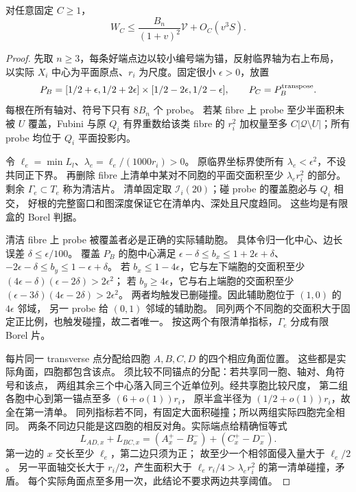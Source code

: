 \begin{lemma}[自适应软权容量]\label{eighth:soft-capacity}
对任意固定 \(C\ge1\)，
\begin{equation}\label{eighth:soft-weight}
 W_C\le\frac{B_n}{(1+v)^2}\mathcal V+O_C(v^3S).
\end{equation}
\end{lemma}
\begin{proof}
先取 \(n\ge3\)，每条好端点边以较小编号端为锚，反射临界轴为右上布局，
以实际 \(X_i\) 中心为平面原点、\(r_i\) 为尺度。固定很小
\(\epsilon>0\)，放置
\[
 P_B=[1/2+\epsilon,1/2+2\epsilon]\times[1/2-2\epsilon,1/2-\epsilon],
 \qquad P_C=P_B^{\rm transpose}.
\]
每根在所有轴对、符号下只有 \(8B_n\) 个 probe。
若某 fibre 上 probe 至少半面积未被 \(U\) 覆盖，Fubini 与原 \(Q_i\)
有界重数给该类 fibre 的 \(r_i^2\) 加权量至多
\(C|\mathcal Q\setminus U|\)；所有 probe 均位于 \(Q_i\) 平面投影内。

令 \(\ell_e=\min L_l\)、\(\lambda_e=\ell_e/(1000r_i)>0\)。
原临界坐标界使所有 \(\lambda_e<\epsilon^2\)，不设共同正下界。
再删除 fibre 上清单中某对不同胞的平面交面积至少
\(\lambda_e r_i^2\) 的部分。剩余 \(\Gamma_e\subset T_e\) 称为清洁片。
清单固定取 \(\mathcal I_i(20)\)；碰 probe 的覆盖胞必与 \(Q_i\) 相交，
好根的完整窗口和图深度保证它在清单内、深处且尺度趋同。
这些均是有限盒的 Borel 判据。

清洁 fibre 上 probe 被覆盖者必是正确的实际辅助胞。
具体令归一化中心、边长误差 \(\delta\le\epsilon/100\)。
覆盖 \(P_B\) 的胞中心满足
\(\epsilon-\delta\le b_x\le1+2\epsilon+\delta\)、
\(-2\epsilon-\delta\le b_y\le1-\epsilon+\delta\)。
若 \(b_x\le1-4\epsilon\)，它与左下端胞的交面积至少
\((4\epsilon-\delta)(\epsilon-2\delta)>2\epsilon^2\)；
若 \(b_y\ge4\epsilon\)，它与右上端胞的交面积至少
\((\epsilon-3\delta)(4\epsilon-2\delta)>2\epsilon^2\)。
两者均触发已删碰撞。因此辅助胞位于 \((1,0)\) 的 \(4\epsilon\) 邻域，
另一 probe 给 \((0,1)\) 邻域的辅助胞。
同列两个不同胞的交面积大于固定正比例，也触发碰撞，故二者唯一。
按这两个有限清单指标，\(\Gamma_e\) 分成有限 Borel 片。

每片同一 transverse 点分配给四胞 \(A,B,C,D\) 的四个相应角面位置。
这些都是实际角面，四胞都包含该点。
须比较不同锚点的分配：若共享同一胞、轴对、角符号和该点，
两组其余三个中心落入同三个近单位列。经共享胞比较尺度，
第二组各胞中心到第一锚点至多 \((6+o(1))r_i\)，
原半盒半径为 \((1/2+o(1))r_i\)，故全在第一清单。
同列指标若不同，有固定大面积碰撞；所以两组实际四胞完全相同。
两条不同边只能是这四胞的相反对角。实际端点给精确恒等式
\[
 L_{AD,x}+L_{BC,x}=(A_x^+-B_x^-)+(C_x^+-D_x^-).
\]
第一边的 \(x\) 交长至少 \(\ell_e\)，第二边只须为正；
故至少一个相邻面侵入量大于 \(\ell_e/2\)。
另一平面轴交长大于 \(r_i/2\)，产生面积大于
\(\ell_er_i/4>\lambda_er_i^2\) 的第一清单碰撞，矛盾。
每个实际角面点至多用一次，此结论不要求两边共享阈值。


\end{proof}
